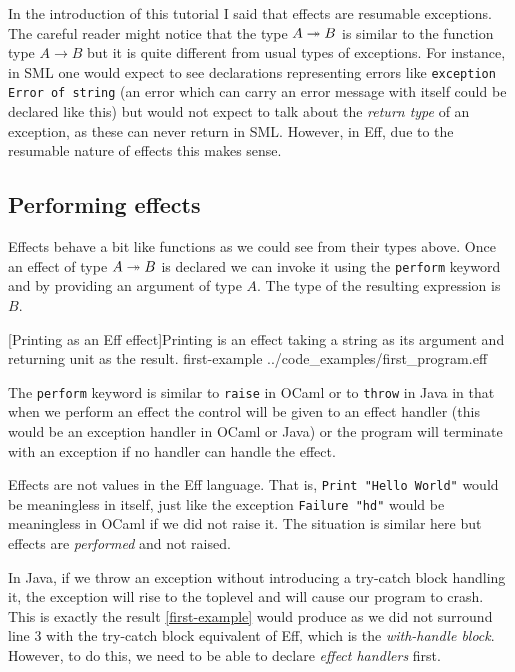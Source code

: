 \documentclass[class=article, crop=false]{standalone}
\begin{document}
In the introduction of this tutorial I said that effects are resumable
exceptions. The careful reader might notice that the type $A \twoheadrightarrow B$ is similar
to the function type $A \to B$ but it is quite different from usual types of
exceptions. For instance, in SML \cite{milner1997definition} one would expect
to see declarations representing errors like
\lstinline{exception Error of string} (an error which can carry an error message
with itself could be declared like this) but would not expect to talk about the
\emph{return type} of an exception, as these can never return in SML. However,
in Eff, due to the resumable nature of effects this makes sense.

\subsection{Performing effects}

Effects behave a bit like functions as we could see from their types above.
Once an effect of type $A \twoheadrightarrow B$ is declared we can invoke it
using the \lstinline{perform} keyword and by providing an argument of type $A$.
The type of the resulting expression is $B$.

{[Printing as an Eff effect]Printing is an effect taking a string as its argument and returning unit as the result.}
{first-example}
{../code_examples/first_program.eff}

The \lstinline{perform} keyword is similar to \lstinline|raise| in OCaml or to
\lstinline|throw| in Java in that when we perform an effect the control will be
given to an effect handler (this would be an exception handler in OCaml or Java)
or the program will terminate with an exception if no handler can handle the
effect.

Effects are not values in the Eff language. That is,
\lstinline{Print "Hello World"} would be meaningless
in itself, just like the exception \lstinline{Failure "hd"} would be meaningless
in OCaml if we did not raise it. The situation is similar here but effects are
\emph{performed} and not raised.

In Java, if we throw an exception without introducing a try-catch block handling
it, the exception will rise to the toplevel and will cause our program to crash.
This is exactly the result \autoref{first-example} would produce as we did not
surround line 3 with the try-catch block equivalent of Eff, which is the
\emph{with-handle block}. However, to do this, we need to be able to declare
\emph{effect handlers} first.
\end{document}
